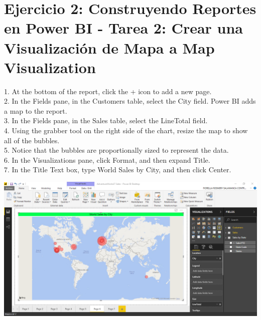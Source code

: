 \section{Ejercicio 2: Construyendo Reportes en Power BI - Tarea 2: Crear una Visualización de Mapa a Map Visualization} 

1. At the bottom of the report, click the + icon to add a new page.\\
2. In the Fields pane, in the Customers table, select the City field. Power BI adds a map to the report.\\
3. In the Fields pane, in the Sales table, select the LineTotal field.\\
4. Using the grabber tool on the right side of the chart, resize the map to show all of the bubbles.\\
5. Notice that the bubbles are proportionally sized to represent the data.\\
6. In the Visualizations pane, click Format, and then expand Title.\\
7. In the Title Text box, type World Sales by City, and then click Center.\\

	\begin{center}
	\includegraphics[width=17cm]{./Imagenes/Ejercicio2/Tarea2/1}
	\end{center}	


